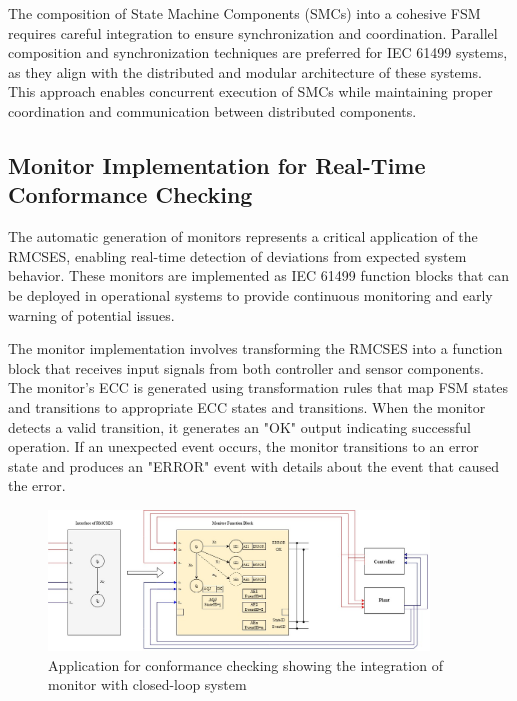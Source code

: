The composition of State Machine Components (SMCs) into a cohesive FSM requires careful integration to ensure synchronization and coordination. Parallel composition and synchronization techniques are preferred for IEC 61499 systems, as they align with the distributed and modular architecture of these systems. This approach enables concurrent execution of SMCs while maintaining proper coordination and communication between distributed components.

\subsection{Monitor Implementation for Real-Time Conformance Checking}

The automatic generation of monitors represents a critical application of the RMCSES, enabling real-time detection of deviations from expected system behavior. These monitors are implemented as IEC 61499 function blocks that can be deployed in operational systems to provide continuous monitoring and early warning of potential issues.

The monitor implementation involves transforming the RMCSES into a function block that receives input signals from both controller and sensor components. The monitor's ECC is generated using transformation rules that map FSM states and transitions to appropriate ECC states and transitions. When the monitor detects a valid transition, it generates an "OK" output indicating successful operation. If an unexpected event occurs, the monitor transitions to an error state and produces an "ERROR" event with details about the event that caused the error.

\begin{figure}[h]
    \centering
    \includegraphics[width=0.9\textwidth]{MX_Papers/Paper7/images/ConformaceCheckingApp.jpg}
    \caption{Application for conformance checking showing the integration of monitor with closed-loop system}
    \label{fig:conformance_checking_app}
\end{figure}

